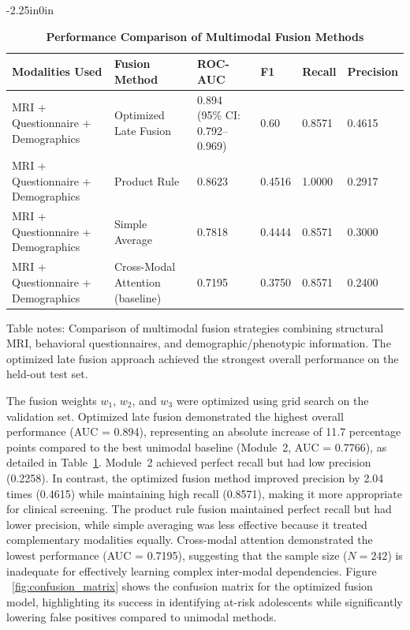 \documentclass[10pt,letterpaper]{article}
\begin{document}
\begin{table}[!t]
\begin{adjustwidth}{-2.25in}{0in}
\centering
\caption{\textbf{Performance Comparison of Multimodal Fusion Methods}}
\label{tab:fusion_results}
\footnotesize
\renewcommand{\arraystretch}{1.15}

\begin{tabular}{|p{3.0cm}|p{3.0cm}|p{2.0cm}|p{2.0cm}|p{2.0cm}|p{2.0cm}|}
\hline
\textbf{Modalities Used} & \textbf{Fusion Method} & \textbf{ROC-AUC} & \textbf{F1} & \textbf{Recall} & \textbf{Precision} \\
\hline

MRI + Questionnaire + Demographics
& Optimized Late Fusion
& 0.894 (95\% CI: 0.792--0.969)
& 0.60
& 0.8571
& 0.4615 \\
\hline

MRI + Questionnaire + Demographics
& Product Rule
& 0.8623
& 0.4516
& 1.0000
& 0.2917 \\
\hline

MRI + Questionnaire + Demographics
& Simple Average
& 0.7818
& 0.4444
& 0.8571
& 0.3000 \\
\hline

MRI + Questionnaire + Demographics
& Cross-Modal Attention (baseline)
& 0.7195
& 0.3750
& 0.8571
& 0.2400 \\
\hline

\end{tabular}

\begin{flushleft}
Table notes: Comparison of multimodal fusion strategies combining
structural MRI, behavioral questionnaires, and demographic/phenotypic
information. The optimized late fusion approach achieved the strongest
overall performance on the held-out test set.
\end{flushleft}

\end{adjustwidth}
\end{table}

The fusion weights $w_1$, $w_2$, and $w_3$ were optimized using grid search on the validation set. Optimized late fusion demonstrated the highest overall performance (AUC = 0.894), representing an absolute increase of 11.7 percentage points compared to the best unimodal baseline (Module~2, AUC = 0.7766), as detailed in Table~\ref{tab:fusion_results}. Module~2 achieved perfect recall but had low precision (0.2258). In contrast, the optimized fusion method improved precision by 2.04 times (0.4615) while maintaining high recall (0.8571), making it more appropriate for clinical screening. The product rule fusion maintained perfect recall but had lower precision, while simple averaging was less effective because it treated complementary modalities equally. Cross-modal attention demonstrated the lowest performance (AUC = 0.7195), suggesting that the sample size ($N = 242$) is inadequate for effectively learning complex inter-modal dependencies. Figure ~\ref{fig:confusion_matrix} shows the confusion matrix for the optimized fusion model, highlighting its success in identifying at-risk adolescents while significantly lowering false positives compared to unimodal methods.
\end{document}
